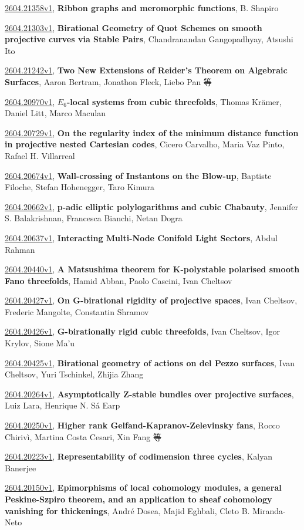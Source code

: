 \documentclass[9pt, a4paper]{article}
\theoremstyle{plain}
\theoremstyle{definition}
\theoremstyle{remark}
\newcommand{\arxiv}[3]{\href{https://arxiv.org/abs/#1}{#1}, \textbf{\textcolor{arxivblue}{#2}}, #3}
\begin{document}
\arxiv{2604.21358v1}{Ribbon graphs and meromorphic functions}{B. Shapiro}

\arxiv{2604.21303v1}{Birational Geometry of Quot Schemes on smooth projective curves via Stable Pairs}{Chandranandan Gangopadhyay, Atsushi Ito}

\arxiv{2604.21242v1}{Two New Extensions of Reider's Theorem on Algebraic Surfaces}{Aaron Bertram, Jonathon Fleck, Liebo Pan 等}

\arxiv{2604.20970v1}{$E_6$-local systems from cubic threefolds}{Thomas Krämer, Daniel Litt, Marco Maculan}

\arxiv{2604.20729v1}{On the regularity index of the minimum distance function in projective nested Cartesian codes}{Cicero Carvalho, Maria Vaz Pinto, Rafael H. Villarreal}

\arxiv{2604.20674v1}{Wall-crossing of Instantons on the Blow-up}{Baptiste Filoche, Stefan Hohenegger, Taro Kimura}

\arxiv{2604.20662v1}{p-adic elliptic polylogarithms and cubic Chabauty}{Jennifer S. Balakrishnan, Francesca Bianchi, Netan Dogra}

\arxiv{2604.20637v1}{Interacting Multi-Node Conifold Light Sectors}{Abdul Rahman}

\arxiv{2604.20440v1}{A Matsushima theorem for K-polystable polarised smooth Fano threefolds}{Hamid Abban, Paolo Cascini, Ivan Cheltsov}

\arxiv{2604.20427v1}{On G-birational rigidity of projective spaces}{Ivan Cheltsov, Frederic Mangolte, Constantin Shramov}

\arxiv{2604.20426v1}{G-birationally rigid cubic threefolds}{Ivan Cheltsov, Igor Krylov, Sione Ma'u}

\arxiv{2604.20425v1}{Birational geometry of actions on del Pezzo surfaces}{Ivan Cheltsov, Yuri Tschinkel, Zhijia Zhang}

\arxiv{2604.20264v1}{Asymptotically Z-stable bundles over projective surfaces}{Luiz Lara, Henrique N. Sá Earp}

\arxiv{2604.20250v1}{Higher rank Gelfand-Kapranov-Zelevinsky fans}{Rocco Chirivì, Martina Costa Cesari, Xin Fang 等}

\arxiv{2604.20223v1}{Representability of codimension three cycles}{Kalyan Banerjee}

\arxiv{2604.20150v1}{Epimorphisms of local cohomology modules, a general Peskine-Szpiro theorem, and an application to sheaf cohomology vanishing for thickenings}{André Dosea, Majid Eghbali, Cleto B. Miranda-Neto}
\end{document}
